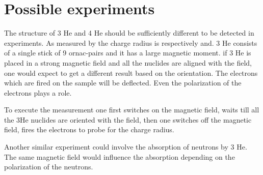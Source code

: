 \chapter{Possible experiments}

The structure of 3 He and 4 He should be sufficiently different to be detected in experiments. As measured by the charge radius is respectively  and. 3 He consists of a single stick of 9 ornac-pairs and it has a large magnetic moment. if 3 He is placed in a strong magnetic field and all the nuclides are aligned with the field, one would expect to get a different result based on the orientation. The electrons which are fired on the sample will be deflected. Even the polarization of the electrons plays a role.

To execute the  measurement one first switches on the magnetic field, waits till all the 3He nuclides are oriented with the field, then one switches off the magnetic field, fires the electrons to probe for the charge radius.

Another similar experiment could involve the absorption of neutrons by 3 He. The same magnetic field would influence the absorption depending on the polarization of the neutrons.

